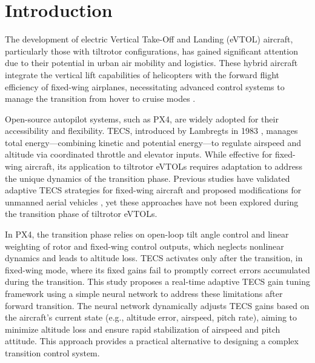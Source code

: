\documentclass[journal,article,submit,pdftex,moreauthors]{Definitions/mdpi}
\begin{document}
\section{Introduction}
The development of electric Vertical Take-Off and Landing (eVTOL) aircraft, particularly those with tiltrotor configurations, has gained significant attention due to their potential in urban air mobility and logistics. These hybrid aircraft integrate the vertical lift capabilities of helicopters with the forward flight efficiency of fixed-wing airplanes, necessitating advanced control systems to manage the transition from hover to cruise modes \cite{ref-journal}.

Open-source autopilot systems, such as PX4, are widely adopted for their accessibility and flexibility. TECS, introduced by Lambregts in 1983 \cite{lambregts1983}, manages total energy—combining kinetic and potential energy—to regulate airspeed and altitude via coordinated throttle and elevator inputs. While effective for fixed-wing aircraft, its application to tiltrotor eVTOLs requires adaptation to address the unique dynamics of the transition phase. Previous studies have validated adaptive TECS strategies for fixed-wing aircraft \cite{bosworth2016} and proposed modifications for unmanned aerial vehicles \cite{bosworthNA}, yet these approaches have not been explored during the transition phase of tiltrotor eVTOLs.

In PX4, the transition phase relies on open-loop tilt angle control and linear weighting of rotor and fixed-wing control outputs, which neglects nonlinear dynamics and leads to altitude loss. TECS activates only after the transition, in fixed-wing mode, where its fixed gains fail to promptly correct errors accumulated during the transition. This study proposes a real-time adaptive TECS gain tuning framework using a simple neural network to address these limitations after forward transition. The neural network dynamically adjusts TECS gains based on the aircraft’s current state (e.g., altitude error, airspeed, pitch rate), aiming to minimize altitude loss and ensure rapid stabilization of airspeed and pitch attitude. This approach provides a practical alternative to designing a complex transition control system.
\end{document}
